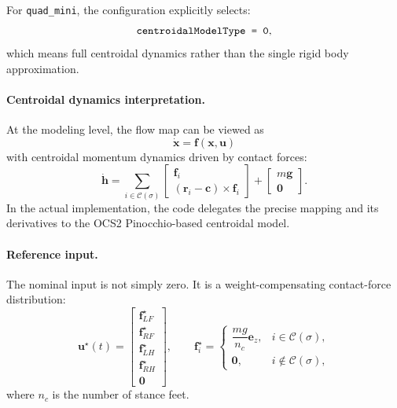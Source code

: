 \documentclass[11pt,a4paper]{article}
\newcommand{\vect}[1]{\boldsymbol{#1}}
\newcommand{\code}[1]{\texttt{#1}}
\begin{document}
For \code{quad\_mini}, the configuration explicitly selects:
\begin{equation}
\text{\code{centroidalModelType = 0}},
\end{equation}
which means full centroidal dynamics rather than the single rigid body approximation.

\paragraph{Centroidal dynamics interpretation.}
At the modeling level, the flow map can be viewed as
\begin{equation}
\dot{\vect{x}} = \vect{f}(\vect{x},\vect{u})
\end{equation}
with centroidal momentum dynamics driven by contact forces:
\begin{equation}
\dot{\vect{h}} =
\sum_{i\in \mathcal{C}(\sigma)}
\begin{bmatrix}
\vect{f}_i \\
(\vect{r}_i - \vect{c}) \times \vect{f}_i
\end{bmatrix}
+
\begin{bmatrix}
m\vect{g} \\
\vect{0}
\end{bmatrix}.
\end{equation}
In the actual implementation, the code delegates the precise mapping and its derivatives to the OCS2 Pinocchio-based centroidal model.

\paragraph{Reference input.}
The nominal input is not simply zero. It is a weight-compensating contact-force distribution:
\begin{equation}
\vect{u}^{\star}(t) =
\begin{bmatrix}
\vect{f}_{LF}^{\star} \\
\vect{f}_{RF}^{\star} \\
\vect{f}_{LH}^{\star} \\
\vect{f}_{RH}^{\star} \\
\vect{0}
\end{bmatrix},
\qquad
\vect{f}_i^{\star} =
\begin{cases}
\dfrac{mg}{n_c}\vect{e}_z, & i \in \mathcal{C}(\sigma),\\[1mm]
\vect{0}, & i \notin \mathcal{C}(\sigma),
\end{cases}
\end{equation}
where $n_c$ is the number of stance feet.
\end{document}
